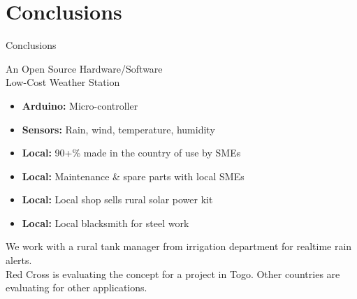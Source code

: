 \documentclass[xcolor=dvipsnames,beamer,unknownkeysallowed]{beamer} %
\begin{document}
\section{Conclusions}
\begin{frame}[fragile]{Conclusions}

\begin{block}{An Open Source Hardware/Software\\ Low-Cost Weather Station}
\begin{itemize} 
 \item {\bf Arduino:} Micro-controller 
 \item {\bf Sensors:} Rain, wind, temperature, humidity
 \item {\bf Local:} 90+\% made in the country of use by SMEs
 \item {\bf Local:} Maintenance \& spare parts with local SMEs
 \item {\bf Local:} Local shop sells rural solar power kit
 \item {\bf Local:} Local blacksmith for steel work
\end{itemize}
We work with a rural tank manager from irrigation department for realtime rain alerts.\\Red Cross is evaluating the concept for a project in Togo. Other countries are evaluating for other applications.
\end{block}

\end{frame}
\end{document}

